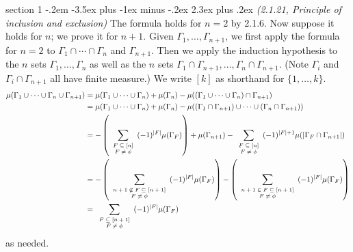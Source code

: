 \documentclass[12pt]{article}
\makeatletter
\theoremstyle{norm}
\newcommand{\F}[0]{\mathbb{F}}
\newcommand{\nin}[0]{\not\in}
\newcommand{\subeq}[0]{\subseteq}
\newcommand{\Ga}[0]{\Gamma}
\newcommand{\pa}[1]{\left( {#1} \right)}
\newenvironment{problem}{\@startsection
       {section}
       {1}
       {-.2em}
       {-3.5ex plus -1ex minus -.2ex}
       {2.3ex plus .2ex}
       {\pagebreak[3]%
       \large\bf\noindent{Problem }
       }
       }
       {%
       }
\makeatother
\begin{document}
\begin{problem}{\it (2.1.21, Principle of inclusion and exclusion)}
The formula holds for $n=2$ by 2.1.6. Now suppose it holds for $n$; we prove it for $n+1$. Given $\Ga_1,\ldots, \Ga_{n+1}$, we first apply the formula for $n=2$ to $\Ga_1\cap \cdots \cap \Ga_n$ and $\Ga_{n+1}$. Then
we apply the induction hypothesis to the $n$ sets $\Ga_1,\ldots, \Ga_{n}$ as well as the $n$ sets $\Ga_1\cap \Ga_{n+1},\ldots, \Ga_n\cap \Ga_{n+1}$. (Note $\Ga_i$ and $\Ga_i\cap \Ga_{n+1}$ all have finite measure.)
We write $[k]$ as shorthand for $\{1,\ldots, k\}$.
\begin{align*}
\mu(\Ga_1\cup \cdots \cup \Ga_{n}\cup \Ga_{n+1})
&=
\mu(\Ga_1\cup \cdots \cup \Ga_n)+\mu(\Ga_n)-\mu((\Ga_1\cup \cdots \cup \Ga_n)\cap \Ga_{n+1})\\
&=
\mu(\Ga_1\cup \cdots \cup \Ga_n)+\mu(\Ga_n)-\mu((\Ga_1\cap \Ga_{n+1})\cup \cdots \cup (\Ga_n\cap \Ga_{n+1}))\\
&=-\pa{\sum_{\scriptsize\begin{array}{c}F\subeq [n]\\F\neq \phi\end{array}} (-1)^{|F|} \mu(\Ga_F)}
+\mu(\Ga_{n+1})
-\sum_{\scriptsize\begin{array}{c} F\subeq [n]\\F\neq \phi\end{array}} (-1)^{|F|+1} \mu(|\Ga_{F}\cap \Ga_{n+1}|)\\
&=
-\pa{\sum_{\scriptsize\begin{array}{c}n+1\nin F\subeq [n+1]\\F\neq \phi\end{array}} (-1)^{|F|} \mu(\Ga_F)}
-\pa{\sum_{\scriptsize\begin{array}{c}n+1\in F\subeq  [n+1]\\F\neq \phi\end{array}} (-1)^{|F|} \mu(\Ga_F)}\\
&=\sum_{\scriptsize\begin{array}{c}F\subeq [n+1]\\F\neq \phi\end{array}} (-1)^{|F|} \mu(\Ga_F)
\end{align*}
as needed.\\


\end{problem}
\end{document}
